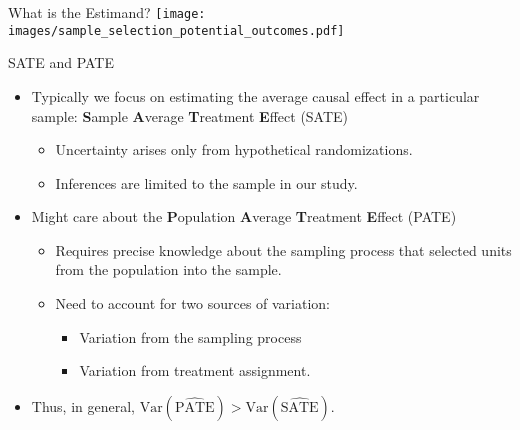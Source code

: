 \documentclass{beamer}
\numberwithin{equation}{section}
\begin{document}
\begin{frame}{What is the Estimand?}
\centering
    \texttt{[image: images/sample\_selection\_potential\_outcomes.pdf]}
\end{frame}

\begin{frame}{SATE and PATE}

\begin{itemize}
\itemsep1pt\parskip0pt
\item
 Typically we focus on estimating the average causal effect in a
  particular sample: \textbf{S}ample \textbf{A}verage \textbf{T}reatment
  \textbf{E}ffect (SATE)\medskip

  \begin{itemize}
   \item Uncertainty arises only from hypothetical randomizations.\medskip
  \item  Inferences are limited to the sample in our study. 
  \end{itemize}\bigskip
\item Might care about the \textbf{P}opulation
  \textbf{A}verage \textbf{T}reatment \textbf{E}ffect (PATE)\medskip
 \begin{itemize}
  \item Requires precise knowledge about the sampling process that selected
    units from the population into the sample.\medskip
\item Need to account for two sources of variation:\medskip
  \begin{itemize}
  \item     Variation from the sampling process\medskip
  \item     Variation from treatment assignment. 
  \end{itemize}
  \end{itemize}\bigskip
\item   Thus, in general,
  $\text{Var}(\widehat{\textrm{PATE}}) > \text{Var}(\widehat{\textrm{SATE}})$.

\end{itemize}
\end{frame}
\end{document}
